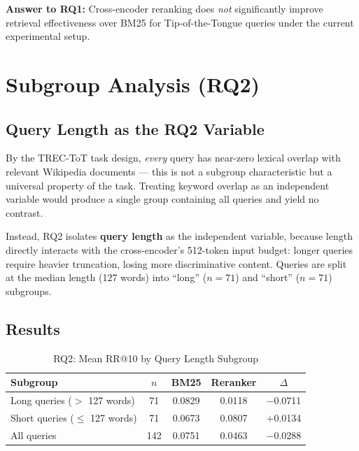 \documentclass[conference]{IEEEtran}
\begin{document}
\textbf{Answer to RQ1:} Cross-encoder reranking does \emph{not} significantly
improve retrieval effectiveness over BM25 for Tip-of-the-Tongue queries under
the current experimental setup.

\section{Subgroup Analysis (RQ2)}
\label{sec:rq2}

\subsection{Query Length as the RQ2 Variable}

By the TREC-ToT task design, \emph{every} query has near-zero lexical
overlap with relevant Wikipedia documents — this is not a subgroup
characteristic but a universal property of the task.
Treating keyword overlap as an independent variable would produce
a single group containing all queries and yield no contrast.

Instead, RQ2 isolates \textbf{query length} as the independent variable,
because length directly interacts with the cross-encoder's 512-token
input budget: longer queries require heavier truncation, losing
more discriminative content.
Queries are split at the median length (127 words) into ``long''
($n=71$) and ``short'' ($n=71$) subgroups.

\subsection{Results}

\begin{table}[t]
\caption{RQ2: Mean RR@10 by Query Length Subgroup}
\label{tab:rq2}
\centering
\begin{tabular}{lcccc}
\toprule
Subgroup & $n$ & BM25 & Reranker & $\Delta$ \\
\midrule
Long queries ($>$ 127 words) & 71 & 0.0829 & 0.0118 & $-$0.0711 \\
Short queries ($\leq$ 127 words) & 71 & 0.0673 & 0.0807 & $+$0.0134 \\
\midrule
All queries & 142 & 0.0751 & 0.0463 & $-$0.0288 \\
\bottomrule
\end{tabular}
\end{table}
\end{document}
